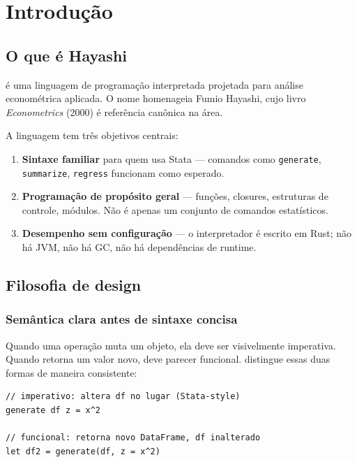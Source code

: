 \chapter{Introdução}

\section{O que é Hayashi}

\hayashi{} é uma linguagem de programação interpretada projetada para análise
econométrica aplicada. O nome homenageia Fumio Hayashi, cujo livro \textit{Econometrics}
(2000) é referência canônica na área.

A linguagem tem três objetivos centrais:

\begin{enumerate}
  \item \textbf{Sintaxe familiar} para quem usa Stata — comandos como \lstinline{generate},
        \lstinline{summarize}, \lstinline{regress} funcionam como esperado.
  \item \textbf{Programação de propósito geral} — funções, closures, estruturas de controle,
        módulos. Não é apenas um conjunto de comandos estatísticos.
  \item \textbf{Desempenho sem configuração} — o interpretador é escrito em Rust; não há
        JVM, não há GC, não há dependências de runtime.
\end{enumerate}

\section{Filosofia de design}

\subsection*{Semântica clara antes de sintaxe concisa}

Quando uma operação muta um objeto, ela deve ser visivelmente imperativa. Quando retorna
um valor novo, deve parecer funcional. \hayashi{} distingue essas duas formas de maneira
consistente:

\begin{lstlisting}[caption={Forma imperativa × forma funcional}]
// imperativo: altera df no lugar (Stata-style)
generate df z = x^2

// funcional: retorna novo DataFrame, df inalterado
let df2 = generate(df, z = x^2)
\end{lstlisting}

